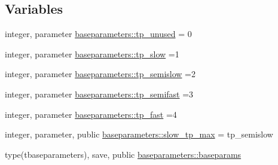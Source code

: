 \subsection*{Variables}
\begin{DoxyCompactItemize}
\item 
integer, parameter \mbox{\hyperlink{namespacebaseparameters_aa9a374c82230367604ae6b1c50ed3e3b}{baseparameters\+::tp\+\_\+unused}} = 0
\item 
integer, parameter \mbox{\hyperlink{namespacebaseparameters_aec8c4b0ea0429954337dcf5fced6abf1}{baseparameters\+::tp\+\_\+slow}} =1
\item 
integer, parameter \mbox{\hyperlink{namespacebaseparameters_a213e8b067e9d21216fbad3fbd98ec933}{baseparameters\+::tp\+\_\+semislow}} =2
\item 
integer, parameter \mbox{\hyperlink{namespacebaseparameters_a4cae4f2dfd7f3b1ed425daca03b67139}{baseparameters\+::tp\+\_\+semifast}} =3
\item 
integer, parameter \mbox{\hyperlink{namespacebaseparameters_ac1f704b0992c1c1c9f90d320ae0c4f4b}{baseparameters\+::tp\+\_\+fast}} =4
\item 
integer, parameter, public \mbox{\hyperlink{namespacebaseparameters_a1d3e10105684d9171cdfec4ccfcd331d}{baseparameters\+::slow\+\_\+tp\+\_\+max}} = tp\+\_\+semislow
\item 
type(tbaseparameters), save, public \mbox{\hyperlink{namespacebaseparameters_abc9ecfbbf4a5012fbc95d3fb51a1e6e3}{baseparameters\+::baseparams}}
\end{DoxyCompactItemize}
